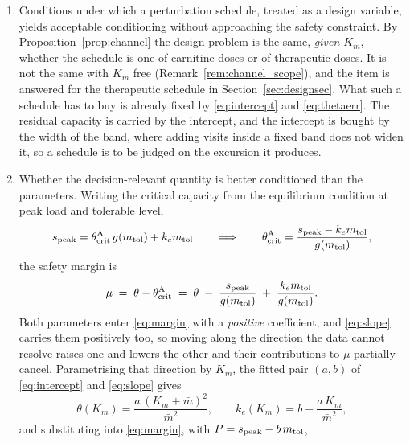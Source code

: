 \begin{enumerate}[leftmargin=*, itemsep=2pt]
\item Conditions under which a perturbation schedule, treated as a design variable,
      yields acceptable conditioning without approaching the safety constraint. By
      Proposition~\ref{prop:channel} the design problem is the same, \emph{given $K_m$},
      whether the schedule is one of carnitine doses or of therapeutic doses. It is not the
      same with $K_m$ free (Remark~\ref{rem:channel_scope}), and the item is answered for
      the therapeutic schedule in Section~\ref{sec:designsec}. What such a schedule has to buy is
      already fixed by \eqref{eq:intercept} and \eqref{eq:thetaerr}. The residual capacity
      is carried by the intercept, and the intercept is bought by the width of the band,
      where adding visits inside a fixed band does not widen it, so a schedule is to be
      judged on the excursion it produces.
\item Whether the decision-relevant quantity is better conditioned than the parameters.
      Writing the critical capacity from the equilibrium condition at peak load and
      tolerable level,
      \begin{equation}
      s_{\mathrm{peak}} = \theta_{\mathrm{crit}}^{\mathrm{A}}\, g(m_{\mathrm{tol}}) + k_e m_{\mathrm{tol}}
      \qquad \Longrightarrow \qquad
      \theta_{\mathrm{crit}}^{\mathrm{A}} = \frac{s_{\mathrm{peak}} - k_e m_{\mathrm{tol}}}{g(m_{\mathrm{tol}})},
      \label{eq:thcrit}
      \end{equation}
      the safety margin is
      \begin{equation}
      \mu \;=\; \theta - \theta_{\mathrm{crit}}^{\mathrm{A}} \;=\; \theta \;-\; \frac{s_{\mathrm{peak}}}{g(m_{\mathrm{tol}})}
      \;+\; \frac{k_e m_{\mathrm{tol}}}{g(m_{\mathrm{tol}})}.
      \label{eq:margin}
      \end{equation}
      Both parameters enter \eqref{eq:margin} with a \emph{positive} coefficient, and
      \eqref{eq:slope} carries them positively too, so moving along the direction the data
      cannot resolve raises one and lowers the other and their contributions to $\mu$
      partially cancel. Parametrising that direction by $K_m$, the fitted pair $(a,b)$ of
      \eqref{eq:intercept} and \eqref{eq:slope} gives
      \begin{equation}
      \theta(K_m) = \frac{a\,(K_m + \bar m)^2}{\bar m^{2}},
      \qquad
      k_e(K_m) = b - \frac{a\,K_m}{\bar m^{2}},
      \label{eq:fibre}
      \end{equation}
      and substituting into \eqref{eq:margin}, with $P = s_{\mathrm{peak}} - b\,m_{\mathrm{tol}}$,
      \begin{equation}

\end{equation}
\end{enumerate}
